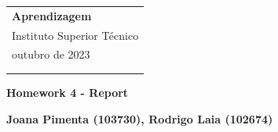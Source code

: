\documentclass[a4paper,12pt]{article} %
\begin{document}
\thispagestyle{empty} %

\begin{tabular}{p{15.5cm}} %
{\large \bf Aprendizagem} \\
Instituto Superior Técnico \\ outubro  de 2023  \\ \\ 
\hline %
\\
\end{tabular} %

\vspace*{0.3cm} %

\begin{center} %
	{\Large \bf Homework 4 - Report} %
	\vspace{2mm}
	
	{\bf Joana Pimenta (103730), Rodrigo Laia (102674) } %
		
\end{center}  

\vspace{0.4cm}
\end{document}

